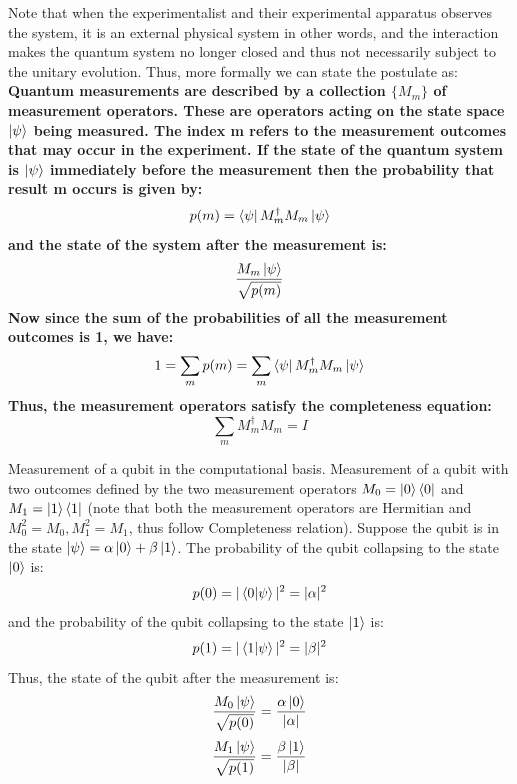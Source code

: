 Note that when the experimentalist and their experimental apparatus observes the system, it is an external physical system in other words, and the interaction
makes the quantum system no longer closed and thus not necessarily subject to the unitary evolution. Thus, more formally we can state the postulate as: \\
\textbf{Quantum measurements are described by a collection $\{M_m\}$ of measurement operators.
These are operators acting on the state space $\ket{\psi}$ being measured. The index m refers to the measurement outcomes 
that may occur in the experiment. If the state of the quantum system is $\ket{\psi}$ immediately before the measurement then the probability that result m
occurs is given by: 
\[
    p(m)=\bra{\psi}M_m^{\dagger}M_m\ket{\psi}
\]
and the state of the system after the measurement is:
\[
    \dfrac{M_m\ket{\psi}}{\sqrt{p(m)}}
\]
Now since the sum of the probabilities of all the measurement outcomes is 1, we have:
\[
    1 = \sum_m p(m) = \sum_m \bra{\psi}M_m^{\dagger}M_m\ket{\psi}
\]
Thus, the measurement operators satisfy the completeness equation:
\[
    \sum_m M_m^{\dagger}M_m=I
\]
}

\begin{example}
    Measurement of a qubit in the computational basis. Measurement of a qubit with two outcomes defined by the two measurement
    operators $M_0=\ket{0}\bra{0}$ and $M_1=\ket{1}\bra{1}$ (note that both the measurement operators are Hermitian and $M_0^2=M_0,M_1^2=M_1$, thus follow Completeness relation).
    Suppose the qubit is in the state $\ket{\psi}=\alpha\ket{0}+\beta\ket{1}$. The probability of the qubit collapsing to the state $\ket{0}$ is:
    \[
        p(0)=|\braket{0|\psi}|^2=|\alpha|^2
    \]
    and the probability of the qubit collapsing to the state $\ket{1}$ is:
    \[
        p(1)=|\braket{1|\psi}|^2=|\beta|^2
    \]
    Thus, the state of the qubit after the measurement is:
    \[
        \dfrac{M_0\ket{\psi}}{\sqrt{p(0)}}=\dfrac{\alpha\ket{0}}{|\alpha|}
    \]
    \[ 
        \dfrac{M_1\ket{\psi}}{\sqrt{p(1)}}=\dfrac{\beta\ket{1}}{|\beta|}
    \]
\end{example}


